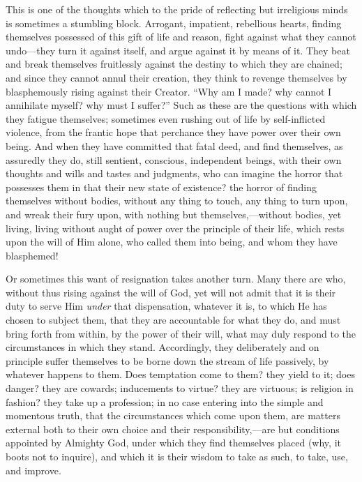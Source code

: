This is one of the thoughts which to the pride of reflecting but
irreligious minds is sometimes a stumbling block. Arrogant, impatient,
rebellious hearts, finding themselves possessed of this gift of life
and reason, fight against what they cannot undo—they turn it against
itself, and argue against it by means of it. They beat and break
themselves fruitlessly against the destiny to which they are chained;
and since they cannot annul their creation, they think to revenge
themselves by blasphemously rising against their Creator. ``Why am
I made? why cannot I annihilate myself? why must I suffer?'' Such
as these are the questions with which they fatigue themselves;
sometimes even rushing out of life by self-inflicted violence, from
the frantic hope that perchance they have power over their own being.
And when they have committed that fatal deed, and find themselves, as
assuredly they do, still sentient, conscious, independent beings, with
their own thoughts and wills and tastes and judgments, who can imagine
the horror that possesses them in that their new state of existence?
the horror of finding themselves without bodies, without any thing to
touch, any thing to turn upon, and wreak their fury upon, with nothing
but themselves,—without bodies, yet living, living without aught of
power over the principle of their life, which rests upon the will of
Him alone, who called them into being, and whom they have blasphemed!

Or sometimes this want of resignation takes another turn. Many
there are who, without thus rising against the will of God, yet will
not admit that it is their duty to serve Him \emph{under} that
dispensation, whatever it is, to which He has chosen to subject them,
that they are accountable for what they do, and must bring forth from
within, by the power of their will, what may duly respond to the
circumstances in which they stand. Accordingly, they deliberately and
on principle suffer themselves to be borne down the stream of life
passively, by whatever happens to them. Does temptation come to them?
they yield to it; does danger? they are cowards; inducements to
virtue? they are virtuous; is religion in fashion? they take up a
profession; in no case entering into the simple and momentous truth,
that the circumstances which come upon them, are matters external both
to their own choice and their responsibility,—are but conditions
appointed by Almighty God, under which they find themselves placed
(why, it boots not to inquire), and which it is their wisdom to take
as such, to take, use, and improve.

